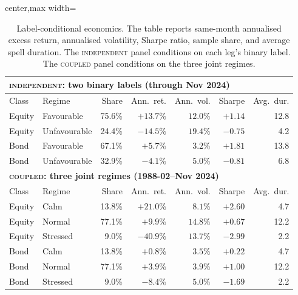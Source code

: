 \documentclass[10pt]{article}
\newcommand{\Acoup}{\textsc{coupled}}
\newcommand{\Bindep}{\textsc{independent}}
\begin{document}
\begin{table}[H]
    \centering
    \caption{Label-conditional economics. The table reports same-month annualised excess return,
        annualised volatility, Sharpe ratio, sample share, and average spell duration. The
        \Bindep{} panel conditions on each leg's binary label. The \Acoup{} panel conditions on the
        three joint regimes.}
    \label{tab:state-economics}
    \small
    \begin{adjustbox}{center,max width=\textwidth}
        \begin{tabular}{@{}llrrrrr@{}}
            \toprule
            \multicolumn{7}{l}{\textbf{\Bindep{}: two binary labels (through Nov 2024)}}                  \\
            \midrule
            Class  & Regime       & Share            & Ann.\ ret. & Ann.\ vol. & Sharpe  & Avg.\ dur.     \\
            \midrule
            Equity & Favourable   & 75.6\%           & $+13.7\%$  & $12.0\%$   & $+1.14$ & 12.8           \\
            Equity & Unfavourable & 24.4\%           & $-14.5\%$  & $19.4\%$   & $-0.75$ & \phantom{0}4.2 \\
            Bond   & Favourable   & 67.1\%           & $+5.7\%$   & $3.2\%$    & $+1.81$ & 13.8           \\
            Bond   & Unfavourable & 32.9\%           & $-4.1\%$   & $5.0\%$    & $-0.81$ & \phantom{0}6.8 \\
            \midrule
            \multicolumn{7}{l}{\textbf{\Acoup{}: three joint regimes (1988-02--Nov 2024)}}                \\
            \midrule
            Class  & Regime       & Share            & Ann.\ ret. & Ann.\ vol. & Sharpe  & Avg.\ dur.     \\
            \midrule
            Equity & Calm         & 13.8\%           & $+21.0\%$  & $8.1\%$    & $+2.60$ & \phantom{0}4.7 \\
            Equity & Normal       & 77.1\%           & $+9.9\%$   & $14.8\%$   & $+0.67$ & 12.2           \\
            Equity & Stressed     & \phantom{0}9.0\% & $-40.9\%$  & $13.7\%$   & $-2.99$ & \phantom{0}2.2 \\
            Bond   & Calm         & 13.8\%           & $+0.8\%$   & $3.5\%$    & $+0.22$ & \phantom{0}4.7 \\
            Bond   & Normal       & 77.1\%           & $+3.9\%$   & $3.9\%$    & $+1.00$ & 12.2           \\
            Bond   & Stressed     & \phantom{0}9.0\% & $-8.4\%$   & $5.0\%$    & $-1.69$ & \phantom{0}2.2 \\
            \bottomrule
        \end{tabular}
    \end{adjustbox}
\end{table}
\end{document}
